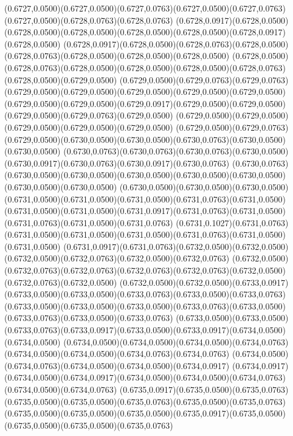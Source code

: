 (0.6727,0.0500)(0.6727,0.0500)(0.6727,0.0763)(0.6727,0.0500)(0.6727,0.0763)(0.6727,0.0500)(0.6728,0.0763)(0.6728,0.0763)
(0.6728,0.0917)(0.6728,0.0500)(0.6728,0.0500)(0.6728,0.0500)(0.6728,0.0500)(0.6728,0.0500)(0.6728,0.0917)(0.6728,0.0500)
(0.6728,0.0917)(0.6728,0.0500)(0.6728,0.0763)(0.6728,0.0500)(0.6728,0.0763)(0.6728,0.0500)(0.6728,0.0500)(0.6728,0.0500)
(0.6728,0.0500)(0.6728,0.0763)(0.6728,0.0500)(0.6728,0.0500)(0.6728,0.0500)(0.6728,0.0763)(0.6728,0.0500)(0.6729,0.0500)
(0.6729,0.0500)(0.6729,0.0763)(0.6729,0.0763)(0.6729,0.0500)(0.6729,0.0500)(0.6729,0.0500)(0.6729,0.0500)(0.6729,0.0500)
(0.6729,0.0500)(0.6729,0.0500)(0.6729,0.0917)(0.6729,0.0500)(0.6729,0.0500)(0.6729,0.0500)(0.6729,0.0763)(0.6729,0.0500)
(0.6729,0.0500)(0.6729,0.0500)(0.6729,0.0500)(0.6729,0.0500)(0.6729,0.0500)
\PST@Solid(0.6729,0.0500)(0.6729,0.0763)(0.6729,0.0500)(0.6730,0.0500)(0.6730,0.0500)(0.6730,0.0763)(0.6730,0.0500)(0.6730,0.0500)
(0.6730,0.0763)(0.6730,0.0763)(0.6730,0.0763)(0.6730,0.0500)(0.6730,0.0917)(0.6730,0.0763)(0.6730,0.0917)(0.6730,0.0763)
(0.6730,0.0763)(0.6730,0.0500)(0.6730,0.0500)(0.6730,0.0500)(0.6730,0.0500)(0.6730,0.0500)(0.6730,0.0500)(0.6730,0.0500)
(0.6730,0.0500)(0.6730,0.0500)(0.6730,0.0500)(0.6731,0.0500)(0.6731,0.0500)(0.6731,0.0500)(0.6731,0.0763)(0.6731,0.0500)
(0.6731,0.0500)(0.6731,0.0500)(0.6731,0.0917)(0.6731,0.0763)(0.6731,0.0500)(0.6731,0.0763)(0.6731,0.0500)(0.6731,0.0763)
(0.6731,0.1027)(0.6731,0.0763)(0.6731,0.0500)(0.6731,0.0500)(0.6731,0.0500)(0.6731,0.0763)(0.6731,0.0500)(0.6731,0.0500)
(0.6731,0.0917)(0.6731,0.0763)(0.6732,0.0500)(0.6732,0.0500)(0.6732,0.0500)(0.6732,0.0763)(0.6732,0.0500)(0.6732,0.0763)
(0.6732,0.0500)(0.6732,0.0763)(0.6732,0.0763)(0.6732,0.0763)(0.6732,0.0763)(0.6732,0.0500)(0.6732,0.0763)(0.6732,0.0500)
(0.6732,0.0500)(0.6732,0.0500)(0.6733,0.0917)(0.6733,0.0500)(0.6733,0.0500)(0.6733,0.0763)(0.6733,0.0500)(0.6733,0.0763)
(0.6733,0.0500)(0.6733,0.0500)(0.6733,0.0500)(0.6733,0.0763)(0.6733,0.0500)(0.6733,0.0763)(0.6733,0.0500)(0.6733,0.0763)
(0.6733,0.0500)(0.6733,0.0500)(0.6733,0.0763)(0.6733,0.0917)(0.6733,0.0500)(0.6733,0.0917)(0.6734,0.0500)(0.6734,0.0500)
(0.6734,0.0500)(0.6734,0.0500)(0.6734,0.0500)(0.6734,0.0763)(0.6734,0.0500)(0.6734,0.0500)(0.6734,0.0763)(0.6734,0.0763)
(0.6734,0.0500)(0.6734,0.0763)(0.6734,0.0500)(0.6734,0.0500)(0.6734,0.0917)
\PST@Solid(0.6734,0.0917)(0.6734,0.0500)(0.6734,0.0917)(0.6734,0.0500)(0.6734,0.0500)(0.6734,0.0763)(0.6734,0.0500)(0.6734,0.0763)
(0.6735,0.0917)(0.6735,0.0500)(0.6735,0.0763)(0.6735,0.0500)(0.6735,0.0500)(0.6735,0.0763)(0.6735,0.0500)(0.6735,0.0763)
(0.6735,0.0500)(0.6735,0.0500)(0.6735,0.0500)(0.6735,0.0917)(0.6735,0.0500)(0.6735,0.0500)(0.6735,0.0500)(0.6735,0.0763)
